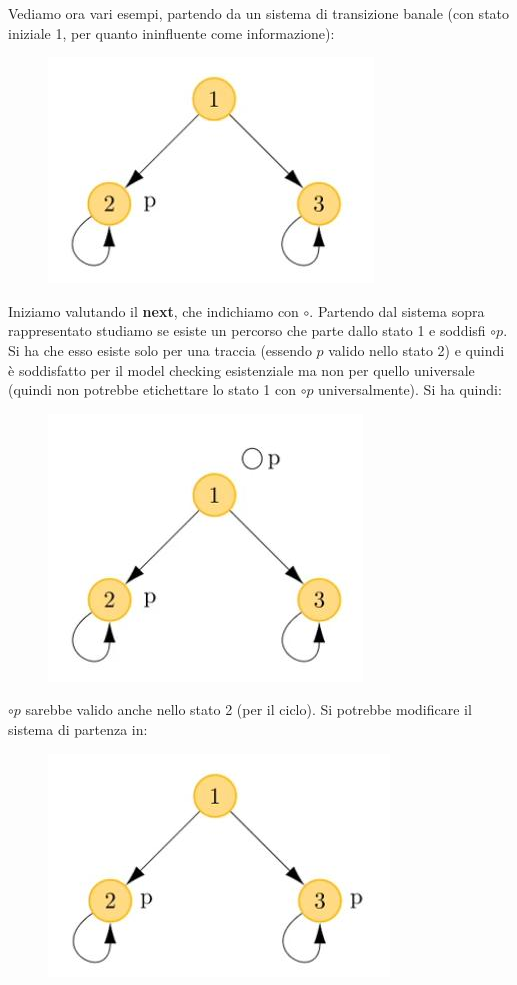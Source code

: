 \documentclass[a4paper,12pt, oneside]{book}
\begin{document}
\newpage
Vediamo ora vari esempi, partendo da un sistema di transizione banale (con stato
iniziale 1, per quanto ininfluente come informazione):
\begin{figure}[H]
  \centering
  \includegraphics[scale = 0.3]{img/nl3.jpg} 
\end{figure}
Iniziamo valutando il \textbf{next}, che indichiamo con $\circ$. Partendo dal
sistema sopra rappresentato studiamo  se esiste un percorso che parte dallo
stato 1 e soddisfi $\circ p$. Si ha che esso
esiste solo per una traccia (essendo $p$ valido nello stato 2) e quindi è
soddisfatto per il model checking esistenziale ma non per quello universale
(quindi non potrebbe etichettare lo stato 1 con $\circ p$ 
universalmente). Si
ha quindi: 
\begin{figure}[H]
  \centering
  \includegraphics[scale = 0.32]{img/nl4.jpg} 
\end{figure}
$\circ p$ sarebbe valido anche nello stato 2 (per il ciclo).
Si potrebbe modificare il sistema di partenza in:
\begin{figure}[H]
  \centering
  \includegraphics[scale = 0.3]{img/nl5.jpg} 
\end{figure}
\end{document}
